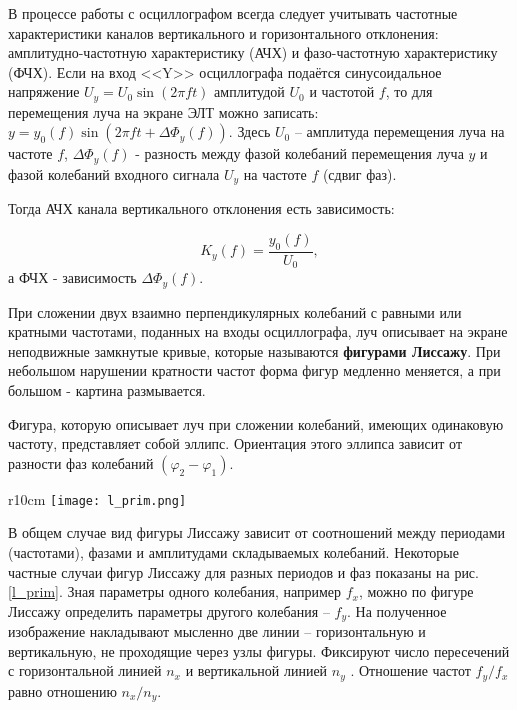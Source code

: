 \documentclass[a4paper,12pt]{article} %
\begin{document}
	В процессе работы с осциллографом всегда следует учитывать частотные характеристики каналов вертикального и горизонтального отклонения: амплитудно-частотную характеристику (АЧХ) и фазо-­частотную характеристику (ФЧХ). Если на вход <<Y>> осциллографа подаётся синусоидальное напряжение $ U_y=U_0\sin\left(2\pi ft\right) $ амплитудой $ U_0 $ и частотой $ f $, то для перемещения луча на экране ЭЛТ можно записать: $ y=y_0\left(f\right)\sin\left(2\pi ft + \Delta\Phi_y\left(f\right)\right) $. Здесь $ U_0 $ -- амплитуда перемещения луча на частоте $ f $, $ \Delta\Phi_y\left(f\right) $ - разность между фазой колебаний перемещения луча $ y $ и фазой колебаний входного сигнала $ U_y $ на частоте $ f $ (сдвиг фаз).
	
	Тогда АЧХ канала вертикального отклонения есть зависимость:
	
	\begin{equation}
		K_y\left(f\right) = \frac{y_0\left(f\right)}{U_0}, \label{ahch}
	\end{equation}
	а ФЧХ - зависимость $ \Delta\Phi_y\left(f\right) $.
	
	При сложении двух взаимно перпендикулярных колебаний с равными или кратными частотами, поданных на входы осциллографа, луч описывает на экране неподвижные замкнутые кривые, которые называются \textbf{фигурами Лиссажу}. При небольшом нарушении кратности частот форма фигур медленно меняется, а при большом - картина размывается.
	
	Фигура, которую описывает луч при сложении колебаний, имеющих одинаковую частоту, представляет собой эллипс. Ориентация этого эллипса зависит от разности фаз колебаний $ \left(\varphi_2-\varphi_1\right) $.
	
	\begin{wrapfigure}{r}{10cm}
		\texttt{[image: l\_prim.png]}
		\caption{Фигуры Лиссажу для колебаний одинаковой амплитуды}
		\label{l_prim}
	\end{wrapfigure}
	
	В общем случае вид фигуры Лиссажу зависит от соотношений между периодами (частотами), фазами и амплитудами складываемых колебаний. Некоторые частные случаи фигур Лиссажу для разных периодов и фаз показаны на рис. \ref{l_prim}. Зная параметры одного колебания, 
	например $ f_x $, можно по фигуре Лиссажу определить параметры другого колебания -- $ f_y $. На полученное изображение накладывают мысленно две линии -- горизонтальную и вертикальную, не проходящие через узлы фигуры. Фиксируют число пересечений с горизонтальной линией $ n_x $ и вертикальной линией $ n_y $ . Отношение частот $ f_y/f_x $ равно отношению $ n_x/n_y $. 
	
\end{document}
